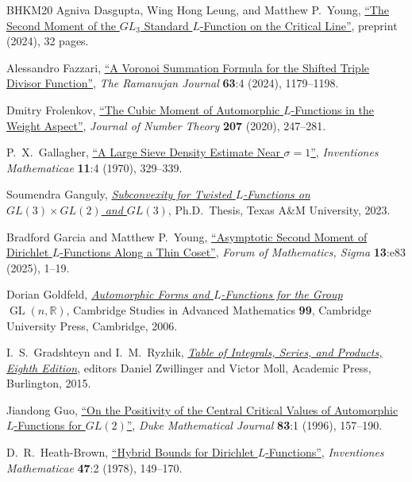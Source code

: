 \documentclass[11pt,a4paper]{amsart}
\newcommand{\R}{\mathbb{R}}
\DeclareMathOperator{\GL}{GL}
\numberwithin{equation}{section}
\theoremstyle{remark}
\theoremstyle{definition}
\begin{document}
\begin{thebibliography}{BHKM20}
 Agniva Dasgupta, Wing Hong Leung, and Matthew P.~Young, \href{https://arxiv.org/abs/2407.06962v1}{``The Second Moment of the $GL_3$ Standard $L$-Function on the Critical Line''}, preprint (2024), 32 pages.

 Alessandro Fazzari, \href{https://doi.org/10.1007/s11139-023-00810-5}{``A Voronoi Summation Formula for the Shifted Triple Divisor Function''}, \textit{The Ramanujan Journal} \textbf{63}:4 (2024), 1179--1198.

 Dmitry Frolenkov, \href{https://doi.org/10.1016/j.jnt.2019.07.009}{``The Cubic Moment of Automorphic $L$-Functions in the Weight Aspect''}, \textit{Journal of Number Theory} \textbf{207} (2020), 247--281.

 P.~X.~Gallagher, \href{https://doi.org/10.1007/BF01403187}{``A Large Sieve Density Estimate Near $\sigma = 1$''}, \textit{Inventiones Mathematicae} \textbf{11}:4 (1970), 329--339.

 Soumendra Ganguly, \href{https://www.proquest.com/docview/2890171113/}{\textit{Subconvexity for Twisted $L$-Functions on $GL(3) \times GL(2)$ and $GL(3)$}}, Ph.D.~Thesis, Texas A\&M University, 2023.

 Bradford Garcia and Matthew P.~Young, \href{https://doi.org/10.1017/fms.2025.44}{``Asymptotic Second Moment of Dirichlet $L$-Functions Along a Thin Coset''}, \textit{Forum of Mathematics, Sigma} \textbf{13}:e83 (2025), 1--19.

 Dorian Goldfeld, \href{https://doi.org/10.1017/CBO9780511542923}{\textit{Automorphic Forms and $L$-Functions for the Group $\GL(n,\R)$}}, Cambridge Studies in Advanced Mathematics \textbf{99}, Cambridge University Press, Cambridge, 2006.

 I.~S.~Gradshteyn and I.~M.~Ryzhik, \href{https://doi.org/10.1016/C2010-0-64839-5}{\textit{Table of Integrals, Series, and Products, Eighth Edition}}, editors Daniel Zwillinger and Victor Moll, Academic Press, Burlington, 2015.

 Jiandong Guo, \href{https://doi.org/10.1215/S0012-7094-96-08307-6}{``On the Positivity of the Central Critical Values of Automorphic $L$-Functions for $GL(2)$''}, \textit{Duke Mathematical Journal} \textbf{83}:1 (1996), 157--190.

 D.~R.~Heath-Brown, \href{https://doi.org/10.1007/BF01578069}{``Hybrid Bounds for Dirichlet $L$-Functions''}, \textit{Inventiones Mathematicae} \textbf{47}:2 (1978), 149--170.


\end{thebibliography}
\end{document}
